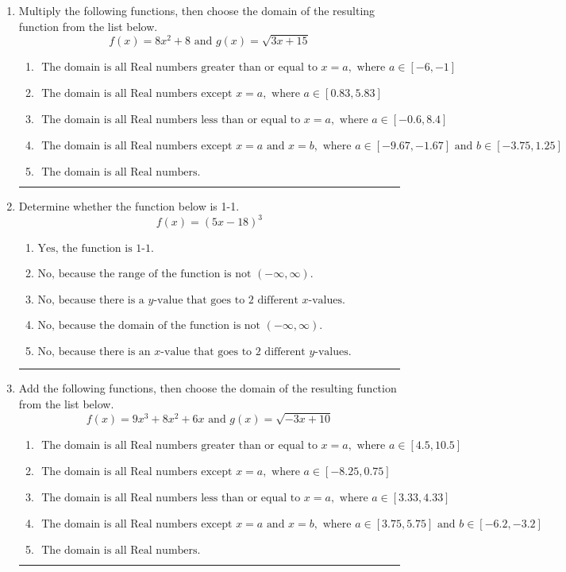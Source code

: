 \documentclass[14pt]{extbook}
\newcommand{\litem}[1]{\item#1\hspace*{-1cm}\rule{\textwidth}{0.4pt}}
\begin{document}
\begin{enumerate}
{\begin{enumerate}[label=\Alph*.]
\end{enumerate} }
\litem{
Multiply the following functions, then choose the domain of the resulting function from the list below.\[ f(x) = 8x^{2} + 8 \text{ and } g(x) = \sqrt{3x+15}  \]\begin{enumerate}[label=\Alph*.]
\item \( \text{ The domain is all Real numbers greater than or equal to } x = a, \text{ where } a \in [-6, -1] \)
\item \( \text{ The domain is all Real numbers except } x = a, \text{ where } a \in [0.83, 5.83] \)
\item \( \text{ The domain is all Real numbers less than or equal to } x = a, \text{ where } a \in [-0.6, 8.4] \)
\item \( \text{ The domain is all Real numbers except } x = a \text{ and } x = b, \text{ where } a \in [-9.67, -1.67] \text{ and } b \in [-3.75, 1.25] \)
\item \( \text{ The domain is all Real numbers. } \)

\end{enumerate} }
\litem{
Determine whether the function below is 1-1.\[ f(x) = (5 x - 18)^3 \]\begin{enumerate}[label=\Alph*.]
\item \( \text{Yes, the function is 1-1.} \)
\item \( \text{No, because the range of the function is not $(-\infty, \infty)$.} \)
\item \( \text{No, because there is a $y$-value that goes to 2 different $x$-values.} \)
\item \( \text{No, because the domain of the function is not $(-\infty, \infty)$.} \)
\item \( \text{No, because there is an $x$-value that goes to 2 different $y$-values.} \)

\end{enumerate} }
\litem{
Add the following functions, then choose the domain of the resulting function from the list below.\[ f(x) = 9x^{3} +8 x^{2} +6 x \text{ and } g(x) = \sqrt{-3x+10}  \]\begin{enumerate}[label=\Alph*.]
\item \( \text{ The domain is all Real numbers greater than or equal to } x = a, \text{ where } a \in [4.5, 10.5] \)
\item \( \text{ The domain is all Real numbers except } x = a, \text{ where } a \in [-8.25, 0.75] \)
\item \( \text{ The domain is all Real numbers less than or equal to } x = a, \text{ where } a \in [3.33, 4.33] \)
\item \( \text{ The domain is all Real numbers except } x = a \text{ and } x = b, \text{ where } a \in [3.75, 5.75] \text{ and } b \in [-6.2, -3.2] \)
\item \( \text{ The domain is all Real numbers. } \)


\end{enumerate}}
\end{enumerate}
\end{document}
